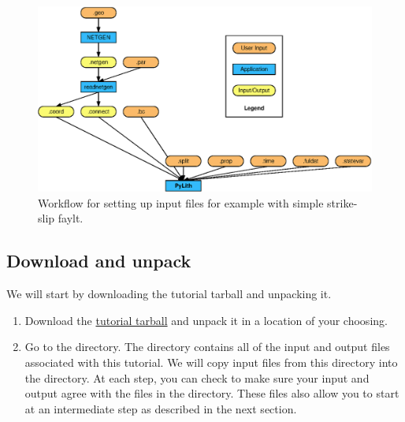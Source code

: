 \begin{figure}[htbp]
  \begin{center}
    \includegraphics{figs/workflow}
    \caption{Workflow for setting up input files for example with
      simple strike-slip faylt.}
    \label{fig:splitcube:workflow}
  \end{center}
\end{figure}

\subsection{Download and unpack}

We will start by downloading the tutorial tarball and unpacking it.

\begin{enumerate}
\item Download the \href{http://www.geodynamics.org:8080/cig/Members/willic3/pylithusers/pylith0.8/pylith-0.8\_tutorials.tgz}{tutorial tarball}
  and unpack it in a location of your choosing.

  \begin{screen}
    \shellprompt{}
  \end{screen}
  
\item Go to the  directory.
  The  directory contains all of the input and
  output files associated with this tutorial. We will copy input files
  from this directory into the  directory. At each
  step, you can check to make sure your input and output agree with
  the files in the  directory. These files also
  allow you to start at an intermediate step as described in the next
  section.

  \begin{screen}
    \shellprompt{}
  \end{screen}

\end{enumerate}


